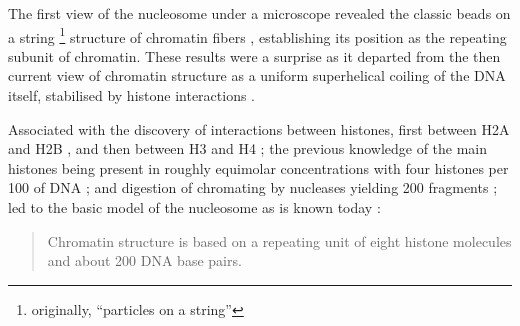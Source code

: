     The first view of the nucleosome under a microscope revealed the
    classic beads on a string \footnote{originally, ``particles on a string''}
    structure of chromatin fibers
     \citep{olin1974-nu-bodies},
    establishing its position as the repeating subunit of chromatin.
    These results were a surprise as it departed from the then current view
    of chromatin structure as a uniform superhelical coiling of the
    DNA itself, stabilised by histone interactions
    \citep{pardon-wilkins-1972model}.

    Associated with the discovery of interactions between histones,
    first between H2A and H2B \citep{anna-isenberg-1974-h2a-h2b}, and
    then between H3 and H4 \citep{kornberg1974-results};
    the previous knowledge of the main histones being present in
    roughly equimolar concentrations with four histones per
    \SI{100}{\bp} of DNA ;
    and digestion of chromating by nucleases yielding
    \SI{200}{\bp} fragments \citep{hewish1973-200bp-pieces};
    led to the basic model of the nucleosome as is known today
    :

    \begin{quotation}
      Chromatin structure is based on a repeating unit of eight
      histone molecules and about 200 DNA base pairs.
    \end{quotation}

